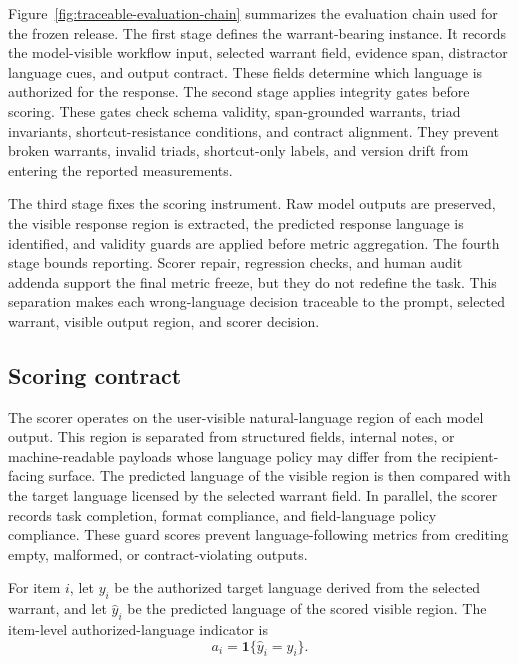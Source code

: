\documentclass[10pt,conference]{IEEEtran}
\begin{document}
Figure~\ref{fig:traceable-evaluation-chain} summarizes the evaluation chain used for the frozen release. The first stage defines the warrant-bearing instance. It records the model-visible workflow input, selected warrant field, evidence span, distractor language cues, and output contract. These fields determine which language is authorized for the response. The second stage applies integrity gates before scoring. These gates check schema validity, span-grounded warrants, triad invariants, shortcut-resistance conditions, and contract alignment. They prevent broken warrants, invalid triads, shortcut-only labels, and version drift from entering the reported measurements.

The third stage fixes the scoring instrument. Raw model outputs are preserved, the visible response region is extracted, the predicted response language is identified, and validity guards are applied before metric aggregation. The fourth stage bounds reporting. Scorer repair, regression checks, and human audit addenda support the final metric freeze, but they do not redefine the task. This separation makes each wrong-language decision traceable to the prompt, selected warrant, visible output region, and scorer decision.

\subsection{Scoring contract}

The scorer operates on the user-visible natural-language region of each model output. This region is separated from structured fields, internal notes, or machine-readable payloads whose language policy may differ from the recipient-facing surface. The predicted language of the visible region is then compared with the target language licensed by the selected warrant field. In parallel, the scorer records task completion, format compliance, and field-language policy compliance. These guard scores prevent language-following metrics from crediting empty, malformed, or contract-violating outputs.


For item $i$, let $y_i$ be the authorized target language derived from the selected warrant, and let $\hat{y}_i$ be the predicted language of the scored visible region. The item-level authorized-language indicator is
\begin{equation}
a_i = \mathbf{1}\{\hat{y}_i = y_i\}.
\label{eq:item-authorized-language}
\end{equation}
\end{document}
